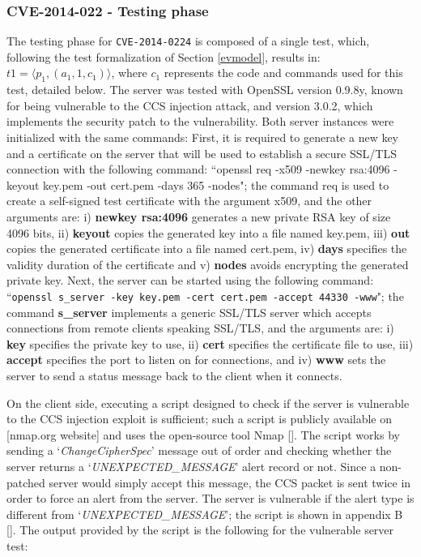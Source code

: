 \subsubsection{CVE-2014-022 - Testing phase}
The testing phase for \texttt{CVE-2014-0224} is composed of a single test, which, following the test formalization of Section \ref{evmodel}, results in: \(t1 = \langle p_1, (a_1, 1, c_1) \rangle\), where \(c_1\) represents the code and commands used for this test, detailed below. The server was tested with OpenSSL version 0.9.8y, known for being vulnerable to the CCS injection attack, and version 3.0.2, which implements the security patch to the vulnerability. Both server instances were initialized with the same commands: First, it is required to generate a new key and a certificate on the server that will be used to establish a secure SSL/TLS connection with the following command:
``openssl req -x509 -newkey rsa:4096 -keyout key.pem -out cert.pem -days 365 -nodes"; the command req is used to create a self-signed test certificate with the argument x509, and the other arguments are: i) \textbf{newkey rsa:4096} generates a new private RSA key of size 4096 bits, ii) \textbf{keyout} copies the generated key into a file named key.pem, iii) \textbf{out} copies the generated certificate into a file named cert.pem, iv) \textbf{days} specifies the validity duration of the certificate and v) \textbf{nodes} avoids encrypting the generated private key.
Next, the server can be started using the following command:
``\texttt{openssl s\_server -key key.pem -cert cert.pem -accept 44330 -www}"; the command \textbf{s\_server} implements a generic SSL/TLS server which accepts connections from remote clients speaking SSL/TLS, and the arguments are: i) \textbf{key} specifies the private key to use, ii) \textbf{cert} specifies the certificate file to use, iii) \textbf{accept} specifies the port to listen on for connections, and iv) \textbf{www} sets the server to send a status message back to the client when it connects.

On the client side, executing a script designed to check if the server is vulnerable to the CCS injection exploit is sufficient; such a script is publicly available on [nmap.org website] and uses the open-source tool Nmap []. The script works by sending a `\textit{ChangeCipherSpec}' message out of order and checking whether the server returns a `\textit{UNEXPECTED\_MESSAGE}' alert record or not. Since a non-patched server would simply accept this message, the CCS packet is sent twice in order to force an alert from the server. The server is vulnerable if the alert type is different from `\textit{UNEXPECTED\_MESSAGE}'; the script is shown in appendix B []. The output provided by the script is the following for the vulnerable server test:  

